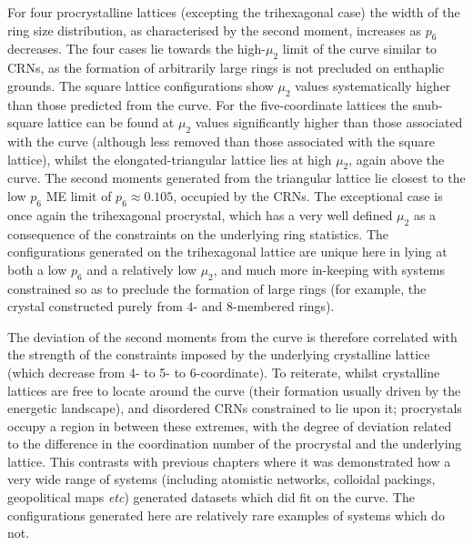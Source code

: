 For four procrystalline lattices (excepting the trihexagonal case) the width of the ring size distribution, as characterised by the second moment, increases as $p_6$ decreases. 
The four cases lie towards the high\--$\mu_2$ limit of the \lm{} curve similar to CRNs, as the formation of arbitrarily large rings is not precluded on enthaplic grounds. 
The square lattice configurations show $\mu_2$ values systematically higher than those predicted from the \lm{} curve. 
For the five-coordinate lattices the snub\--square lattice can be found at $\mu_2$ values significantly higher than those associated with the \lm{} curve (although less removed than those
associated with the square lattice), whilst the elongated\--triangular lattice lies at high $\mu_2$, again
above the \lm{} curve. 
The second moments generated from the triangular lattice lie closest to the low $p_6$ ME limit of $p_6\approx{0.105}$, occupied by the CRNs. 
The exceptional case is once again the trihexagonal procrystal, which has a very well defined $\mu_2$ as a consequence of the constraints on the underlying ring statistics.
The configurations generated on the trihexagonal lattice are unique here in lying at both a low $p_6$ and a relatively low $\mu_2$, and much more in-keeping with systems constrained so as to preclude the formation of large rings (for example, the \td{} crystal constructed purely from $4$\-- and $8$\--membered rings).

The deviation of the second moments from the \lm{} curve is therefore correlated with the strength of the constraints imposed by the underlying crystalline lattice (which decrease from 4\-- to 5\-- to 6\--coordinate).
To reiterate, whilst crystalline lattices are free to locate around the \lm{} curve (their formation usually driven by the energetic landscape), and disordered CRNs constrained to lie upon it; procrystals occupy a region in between these extremes, with the degree of deviation related to the difference in the coordination number of the procrystal and the  underlying lattice.
This contrasts with previous chapters where it was demonstrated how a very wide range of systems (including atomistic networks, colloidal packings, geopolitical maps {\it etc}) generated datasets which did fit on the \lm{} curve.
The configurations generated here are relatively rare examples of systems which do not.


